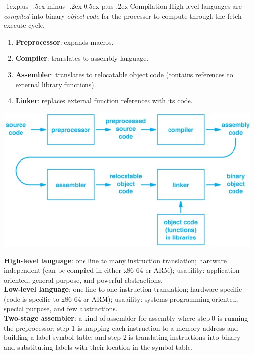 \documentclass[10pt,landscape]{article}
\makeatletter
\renewcommand{\subsection}{\@startsection{subsection}{2}{0mm}%
                                {-1explus -.5ex minus -.2ex}%
                                {0.5ex plus .2ex}%
                                {\normalfont\scriptsize\bfseries}}
\makeatother
\begin{document}
\begin{multicols}{3}
\subsection{Compilation}
High-level languages are \textit{compiled} into binary \textit{object code} for the processor to compute through the fetch-execute cycle. 
\begin{enumerate}
\item \textbf{Preprocessor}: expands macros.
\item \textbf{Compiler}: translates to assembly language.
\item\textbf{Assembler}: translates to relocatable object code (contains references to external library functions).
\item \textbf{Linker}: replaces external function references with its code.
\end{enumerate}
{\centering \includegraphics[scale=0.35]{img/c.png}\par}
\textbf{High-level language}: one line to many instruction translation; hardware independent (can be  compiled in either x86-64 or ARM); usability: application oriented, general purpose, and powerful abstractions.\\
\textbf{Low-level language}: one line to one instruction translation; hardware specific (code is specific to x86-64 or ARM); usability: systems programming oriented, special purpose, and few abstractions.\\
\textbf{Two-stage assembler}: a kind of assembler for assembly where step 0 is running the preprocessor; step 1 is mapping each instruction to a memory address and building a label symbol table; and step 2 is translating instructions into binary and substituting labels with their location in the symbol table.

\end{multicols}
\end{document}

